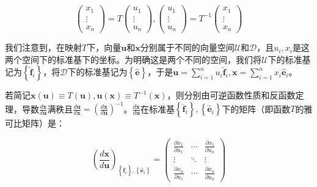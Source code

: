 \documentclass[main.tex]{subfiles}
\begin{document}
\begin{equation*}
    \left(\begin{array}{c}x_1\\\vdots\\x_n\end{array}\right)=T\left(\begin{array}{c}u_1\\\vdots\\u_n\end{array}\right),\left(\begin{array}{c}u_1\\\vdots\\u_n\end{array}\right)=T^{-1}\left(\begin{array}{c}x_1\\\vdots\\x_n\end{array}\right)
\end{equation*}

我们注意到，在映射$T$下，向量$\mathbf{u}$和$\mathbf{x}$分别属于不同的向量空间$\mathcal{U}$和$\mathcal{D}$，且$u_i,x_i$是这两个空间下的标准基下的坐标。为明确这是两个不同的空间，我们将$\mathcal{U}$下的标准基记为$\left\{\mathbf{\hat{f}}_i\right\}$，将$\mathcal{D}$下的标准基记为$\left\{\mathbf{\hat{e}}\right\}$，于是$\mathbf{u}=\sum_{i=1}^nu_i\mathbf{\hat{f}}_i,\mathbf{x}=\sum_{i=1}^nx_i\mathbf{\hat{e}}_i$。

若简记$\mathbf{x}\left(\mathbf{u}\right)\equiv T\left(\mathbf{u}\right),\mathbf{u}\left(\mathbf{x}\right)\equiv T^{-1}\left(\mathbf{x}\right)$，则分别由可逆函数性质和反函数定理，导数$\frac{d\mathbf{x}}{d\mathbf{u}}$满秩且$\frac{d\mathbf{u}}{d\mathbf{x}}=\left(\frac{d\mathbf{x}}{d\mathbf{u}}\right)^{-1}$。$\frac{d\mathbf{x}}{d\mathbf{u}}$在标准基$\left\{\mathbf{\hat{f}}_i\right\},\left\{\mathbf{\hat{e}}_i\right\}$下的矩阵（即函数$T$的雅可比矩阵）是：

\[\left(\frac{d\mathbf{x}}{d\mathbf{u}}\right)_{\left\{\mathbf{\hat{f}}_i\right\},\left\{\mathbf{\hat{e}}_i\right\}}=\left(\begin{array}{ccc}
\frac{\partial x_1}{\partial u_1}&\cdots&\frac{\partial x_1}{\partial u_n}\\
\vdots&\ddots&\vdots\\
\frac{\partial x_n}{\partial u_1}&\cdots&\frac{\partial x_n}{\partial u_n}\end{array}\right)\]
\end{document}
